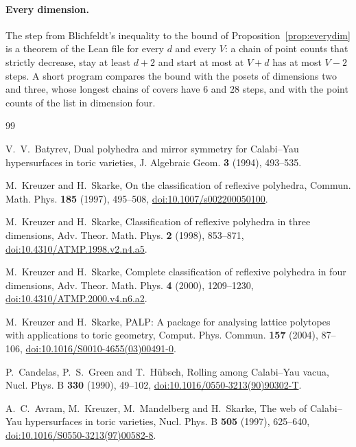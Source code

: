 \documentclass[11pt]{amsart}
\theoremstyle{definition}
\theoremstyle{remark}
\begin{document}
\paragraph*{Every dimension.} The step from Blichfeldt's inequality to the
bound of Proposition~\ref{prop:everydim} is a theorem of the Lean file for
every $d$ and every $V$: a chain of point counts that strictly decrease,
stay at least $d+2$ and start at most at $V+d$ has at most $V-2$ steps. A
short program compares the bound with the posets of dimensions two and
three, whose longest chains of covers have $6$ and $28$ steps, and with the
point counts of the list in dimension four.

\begingroup\raggedright
\begin{thebibliography}{99}

V.~V.~Batyrev, Dual polyhedra and mirror symmetry for Calabi--Yau
hypersurfaces in toric varieties, J. Algebraic Geom. \textbf{3} (1994), 493--535.

M.~Kreuzer and H.~Skarke, On the classification of reflexive polyhedra,
Commun. Math. Phys. \textbf{185} (1997), 495--508,
\href{https://doi.org/10.1007/s002200050100}{doi:10.1007/s002200050100}.

M.~Kreuzer and H.~Skarke, Classification of reflexive polyhedra in three
dimensions, Adv. Theor. Math. Phys. \textbf{2} (1998), 853--871,
\href{https://doi.org/10.4310/ATMP.1998.v2.n4.a5}{doi:10.4310/ATMP.1998.v2.n4.a5}.

M.~Kreuzer and H.~Skarke, Complete classification of reflexive polyhedra
in four dimensions, Adv. Theor. Math. Phys. \textbf{4} (2000), 1209--1230,
\href{https://doi.org/10.4310/ATMP.2000.v4.n6.a2}{doi:10.4310/ATMP.2000.v4.n6.a2}.

M.~Kreuzer and H.~Skarke, PALP: A package for analysing lattice polytopes
with applications to toric geometry, Comput. Phys. Commun. \textbf{157} (2004), 87--106,
\href{https://doi.org/10.1016/S0010-4655(03)00491-0}{doi:10.1016/S0010-4655(03)00491-0}.

P.~Candelas, P.~S.~Green and T.~H\"ubsch, Rolling among Calabi--Yau
vacua, Nucl. Phys. B \textbf{330} (1990), 49--102,
\href{https://doi.org/10.1016/0550-3213(90)90302-T}{doi:10.1016/0550-3213(90)90302-T}.

A.~C.~Avram, M.~Kreuzer, M.~Mandelberg and H.~Skarke, The web of
Calabi--Yau hypersurfaces in toric varieties, Nucl. Phys. B \textbf{505} (1997), 625--640,
\href{https://doi.org/10.1016/S0550-3213(97)00582-8}{doi:10.1016/S0550-3213(97)00582-8}.


\end{thebibliography}
\end{document}
